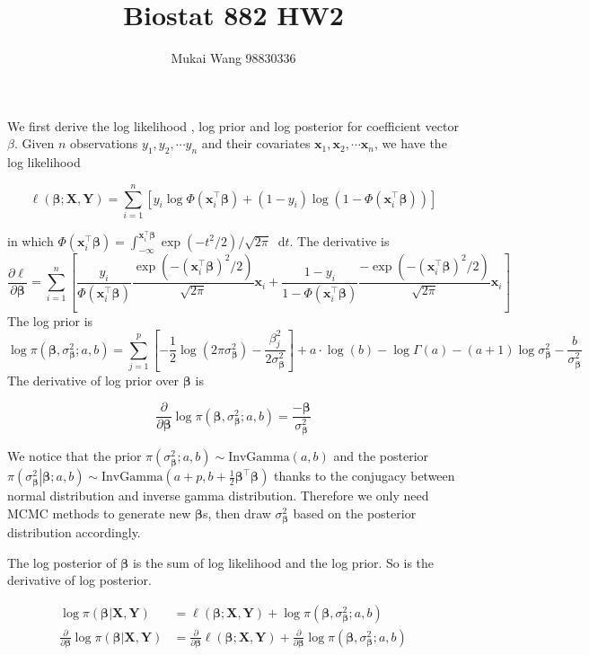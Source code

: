 \documentclass[12pt]{article}
\title{Biostat 882 HW2}
\date{}
\author{Mukai Wang 98830336}
\newcommand*\diff{\mathop{}\!\mathrm{d}}
\begin{document}
\maketitle

We first derive the log likelihood , log prior and log posterior for coefficient vector $\beta$. Given $n$ observations $y_1, y_2, \cdots y_n$ and their covariates $\bm{x}_1, \bm{x}_2, \cdots \bm{x}_n$, we have the log likelihood

\[ \ell(\bm{\beta}; \bm{X}, \bm{Y}) = \sum_{i=1}^{n} \left[ y_i \log \Phi(\bm{x}_i^\top \bm{\beta}) + (1-y_i) \log \left(1 - \Phi(\bm{x}_i^\top \bm{\beta})\right)\right] \]

 in which $\Phi(\bm{x}_i^\top \bm{\beta}) = \int_{-\infty}^{\bm{x}_i^\top \bm{\beta}} \exp \left(-t^2 / 2 \right) / \sqrt{2\pi} \diff t$. The derivative is 
 \[\frac{\partial \ell}{\partial \bm{\beta}} = \sum_{i=1}^{n} \left[ \frac{y_i}{\Phi(\bm{x}_i^\top \bm{\beta})} \frac{\exp (-(\bm{x}_i^\top \bm{\beta})^2 / 2)}{\sqrt{2\pi}}\bm{x}_i + \frac{1-y_i}{1-\Phi(\bm{x}_i^\top \bm{\beta})} \frac{-\exp (-(\bm{x}_i^\top \bm{\beta})^2 / 2)}{\sqrt{2\pi}} \bm{x}_i \right] \]
The log prior is
\[ \log \pi(\bm{\beta}, \sigma^2_{\bm{\beta}}; a,b) = \sum_{j=1}^{p}\left[-\frac{1}{2}\log(2\pi\sigma^2_{\bm{\beta}}) - \frac{\beta^2_j}{2\sigma^2_{\bm{\beta}} } \right] + a\cdot \log(b) - \log\Gamma(a) - (a+1)\log \sigma^2_{\bm{\beta}} - \frac{b}{\sigma^2_{\bm{\beta}}} \]
The derivative of log prior over $\bm{\beta}$ is

\[ \frac{\partial}{\partial \bm{\beta}}\log \pi(\bm{\beta}, \sigma^2_{\bm{\beta}}; a,b) = \frac{-\bm{\beta}}{\sigma^2_{\bm{\beta}}} \]

We notice that the prior  $\pi\left(\sigma^2_{\bm{\beta}}; a,b\right) \sim \text{InvGamma}(a, b)$ and the posterior $\pi\left(\left. \sigma^2_{\bm{\beta}}\right\vert \bm{\beta}; a,b\right) \sim \text{InvGamma}\left(a+p, b+\frac{1}{2}\bm{\beta}^\top \bm{\beta}\right)$ thanks to the conjugacy between normal distribution and inverse gamma distribution. Therefore we only need MCMC methods to generate new $\bm{\beta}$s, then draw $\sigma^2_{\bm{\beta}}$ based on the posterior distribution accordingly.

The log posterior of $\bm{\beta}$ is the sum of log likelihood and the log prior. So is the derivative of log posterior.


\begin{align*}
	\log \pi \left(\left.\bm{\beta} \right\vert  \bm{X}, \bm{Y} \right)&=  \ell(\bm{\beta}; \bm{X}, \bm{Y}) + \log \pi(\bm{\beta}, \sigma^2_{\bm{\beta}}; a,b) \\
	\frac{\partial}{\partial \bm{\beta}} \log \pi \left(\left.\bm{\beta} \right\vert  \bm{X}, \bm{Y} \right) &=  \frac{\partial}{\partial \bm{\beta}}\ell(\bm{\beta}; \bm{X}, \bm{Y}) + \frac{\partial}{\partial \bm{\beta}}\log \pi(\bm{\beta}, \sigma^2_{\bm{\beta}}; a,b)
\end{align*}
\end{document}
